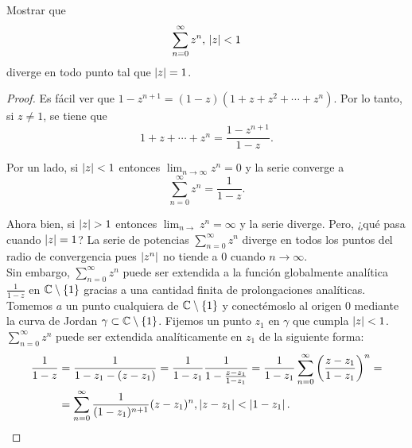 \begin{example}
    Mostrar que
    \begin{equation*}
        \sum_{n=0}^{\infty} z^n, \, \left\lvert z\right\rvert < 1
    \end{equation*}
    diverge en todo punto tal que $\left\lvert z\right\rvert = 1$.
\end{example}

\begin{proof}
Es fácil ver que $1 - z^{n+1} = (1 - z) (1+ z + z^2 + \cdots + z^n)$. Por lo tanto, si $z \neq 1$, se tiene que
\begin{equation}
    1 + z + \cdots + z^n = \frac{1 - z^{n+1}}{1-z}.
\end{equation}

Por un lado, si $\left\lvert z\right\rvert < 1$ entonces $\lim_{n \to \infty} z^n = 0$ y la serie converge a
\begin{equation*}
    \sum_{n=0}^{\infty} z^n = \frac{1}{1 - z}.
\end{equation*}

Ahora bien, si $\left\lvert z\right\rvert > 1$ entonces $\lim_{n \to} z^n = \infty$ y la serie diverge. Pero, ¿qué pasa cuando $\left\lvert z\right\rvert = 1$? La serie de potencias $\sum_{n=0}^{\infty} z^n$ diverge en todos los puntos del radio de convergencia pues $\left\lvert z^n\right\rvert$ no tiende a 0 cuando $n \to \infty$. \\

Sin embargo, $\sum_{n=0}^{\infty} z^n$ puede ser extendida a la función globalmente analítica $\frac{1}{1-z}$ en $\mathbb{C} \setminus \{1\}$ gracias a una cantidad finita de prolongaciones analíticas. \\

Tomemos $a$ un punto cualquiera de $\mathbb{C} \setminus \{1\}$ y conectémoslo al origen $0$ mediante la curva de Jordan $\gamma \subset \mathbb{C} \setminus \{1\}$. Fijemos un punto $z_1$ en $\gamma$ que cumpla $\left\lvert z\right\rvert < 1$. $\sum_{n=0}^{\infty} z^n$ puede ser extendida analíticamente en $z_1$ de la siguiente forma:
\begin{equation*}
    \begin{split}
        \frac{1}{1-z} & = \frac{1}{1 - z_1 - (z - z_1)} = \frac{1}{1 - z_1} \frac{1}{1 - \frac{z - z_1}{1 - z_1}} = \frac{1}{1 - z_1} \sum_{n=0}^{\infty} \left(\frac{z - z_1}{1 - z_1} \right)^n = \\
                      & = \sum_{n=0}^{\infty}  \frac{1}{(1 - z_1)^{n+1}} (z - z_1)^n, \left\lvert z - z_1\right\rvert < \left\lvert1 - z_1\right\rvert.
    \end{split}
\end{equation*}


\end{proof}
